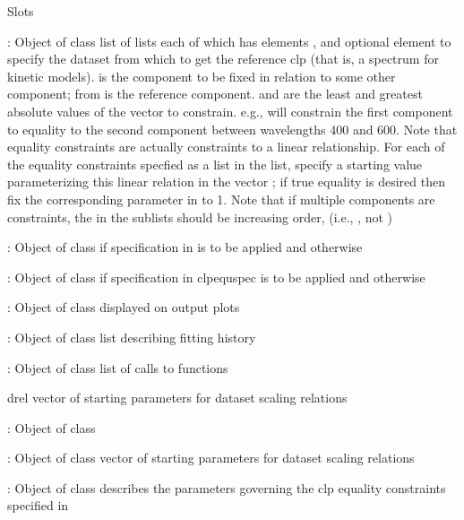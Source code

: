 \begin{Section}{Slots}
{\item[\code{clpequspec}:] Object of class  list of lists each of which has elements , and optional element  to specify the dataset
from which to get the reference clp (that is, a spectrum for kinetic 
models).   is the component to be fixed in relation to some other 
component; from is the reference component.   and  
are the 
least and greatest absolute values of the  vector to constrain. 
e.g., 
will constrain the first component to equality to the second component 
between wavelengths 400 and 600.  Note that equality constraints are
actually constraints to a linear relationship.  For each of the equality
constraints specfied as a list in the  list, specify a
starting value parameterizing this linear relation in the vector
; if true equality is desired then fix the corresponding
parameter in  to 1.  Note that if multiple components are
constraints, the  in the sublists should be increasing order, 
(i.e., , not )
\item[\code{lclp0}:] Object of class   if specification in  
is to be applied and  otherwise 
\item[\code{lclpequ}:] Object of class   if specification in clpequspec 
is to be applied and  otherwise
\item[\code{title}:] Object of class  displayed on output plots
\item[\code{mhist}:] Object of class   list describing fitting history
\item[\code{datCall}:] Object of class  list of calls to functions
\item[drel] vector of starting parameters for dataset scaling relations
\item[\code{dscalspec}:] Object of class  
\item[\code{drel}:] Object of class   vector of starting parameters for dataset scaling relations
\item[\code{clpequ}:] Object of class   describes the
parameters governing the clp equality constraints specified in 
}
\end{Section}
